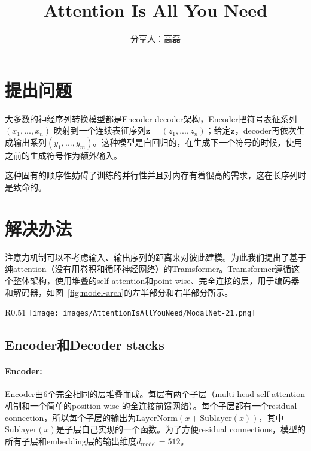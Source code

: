 \documentclass[a4paper,UTF8,no-math]{ctexart}
\title{Attention Is All You Need}
\author{
	分享人：高磊
}
\date{ \zhtoday}
\newcommand{\dmodel}{d_{\text{model}}}
\begin{document}
	
	
	\maketitle
	
	\section{提出问题}
	
	大多数的神经序列转换模型都是Encoder-decoder架构，Encoder把符号表征系列 $(x_1, ..., x_n)$ 映射到一个连续表征序列$\mathbf{z} = (z_1, ..., z_n)$；给定$\mathbf{z}$，decoder再依次生成输出系列$(y_1,...,y_m)$。这种模型是自回归的，在生成下一个符号的时候，使用之前的生成符号作为额外输入。
	
	这种固有的顺序性妨碍了训练的并行性并且对内存有着很高的需求，这在长序列时是致命的。
	
	\section{解决办法}
	
	注意力机制可以不考虑输入、输出序列的距离来对彼此建模。为此我们提出了基于纯attention（没有用卷积和循环神经网络）的Tramsformer。Tramsformer遵循这个整体架构，使用堆叠的self-attention和point-wise、完全连接的层，用于编码器和解码器，如图~\ref{fig:model-arch}的左半部分和右半部分所示。
	\begin{wrapfigure}{R}{0.51\textwidth}
		\centering
		\texttt{[image: images/AttentionIsAllYouNeed/ModalNet-21.png]}
		\caption{The Transformer - model architecture.}
		\label{fig:model-arch}
	\end{wrapfigure}
	
	
	\subsection{Encoder和Decoder stacks}
	
	\paragraph{Encoder:}Encoder由6个完全相同的层堆叠而成。每层有两个子层（multi-head self-attention 机制和一个简单的position-wise 的全连接前馈网络）。每个子层都有一个residual connection，所以每个子层的输出为$\mathrm{LayerNorm}(x + \mathrm{Sublayer}(x))$，其中$\mathrm{Sublayer}(x)$是子层自己实现的一个函数。为了方便residual connections，模型的所有子层和embedding层的输出维度$\dmodel=512$。
	
\end{document}
